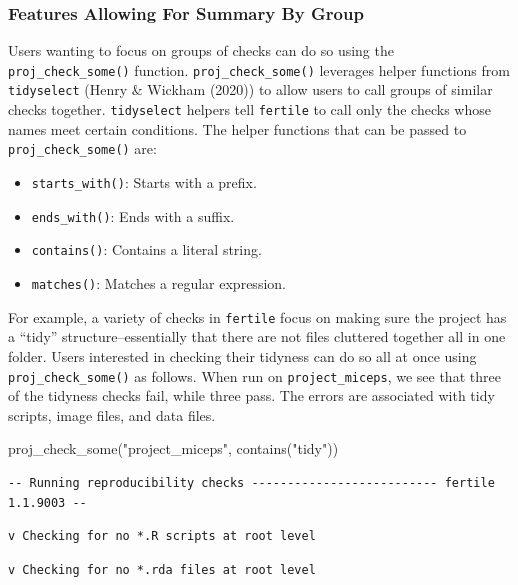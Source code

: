 \documentclass[12pt,twoside]{reedthesis}
\newenvironment{Shaded}{\begin{snugshade}}{\end{snugshade}}
\newcommand{\FunctionTok}[1]{\textcolor[rgb]{0.00,0.00,0.00}{#1}}
\newcommand{\NormalTok}[1]{#1}
\newcommand{\StringTok}[1]{\textcolor[rgb]{0.31,0.60,0.02}{#1}}
\providecommand{\tightlist}{%
  \setlength{\itemsep}{0pt}\setlength{\parskip}{0pt}}
\begin{document}
\hypertarget{features-allowing-for-summary-by-group}{%
\subsubsection{Features Allowing For Summary By Group}\label{features-allowing-for-summary-by-group}}

Users wanting to focus on groups of checks can do so using the \texttt{proj\_check\_some()} function.
\texttt{proj\_check\_some()} leverages helper functions from \texttt{tidyselect} (Henry \& Wickham (2020)) to allow users to call groups of similar checks together. \texttt{tidyselect} helpers tell \texttt{fertile} to call only the checks whose names meet certain conditions. The helper functions that can be passed to \texttt{proj\_check\_some()} are:
\begin{itemize}
\tightlist
\item
  \texttt{starts\_with()}: Starts with a prefix.
\item
  \texttt{ends\_with()}: Ends with a suffix.
\item
  \texttt{contains()}: Contains a literal string.
\item
  \texttt{matches()}: Matches a regular expression.
\end{itemize}
For example, a variety of checks in \texttt{fertile} focus on making sure the project has a ``tidy'' structure--essentially that there are not files cluttered together all in one folder. Users interested in checking their tidyness can do so all at once using \texttt{proj\_check\_some()} as follows. When run on \texttt{project\_miceps}, we see that three of the tidyness checks fail, while three pass. The errors are associated with tidy scripts, image files, and data files.
\begin{Shaded}
\begin{Highlighting}[]
\FunctionTok{proj\_check\_some}\NormalTok{(}\StringTok{"project\_miceps"}\NormalTok{, }\FunctionTok{contains}\NormalTok{(}\StringTok{"tidy"}\NormalTok{))}
\end{Highlighting}
\end{Shaded}
\footnotesize
\begin{verbatim}
-- Running reproducibility checks -------------------------- fertile 1.1.9003 --
\end{verbatim}
\begin{verbatim}
v Checking for no *.R scripts at root level
\end{verbatim}
\begin{verbatim}
v Checking for no *.rda files at root level
\end{verbatim}
\end{document}
